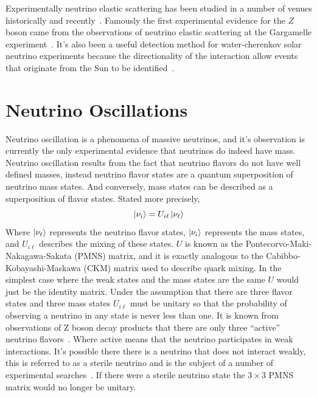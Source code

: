 Experimentally neutrino elastic scattering has been studied in a number
of venues historically and recently~\cite{reines2, es_measurement, nutev}.
Famously the first experimental evidence for the $Z$ boson came from
the observations of neutrino elastic scattering at the
Gargamelle experiment~\cite{gargamelle}.
It's also been a useful detection method for water-cherenkov solar
neutrino experiments because the directionality of the interaction
allow events that originate from the Sun to be identified~\cite{sno_first,
kamiokande, superk_first_solar}.

\section{Neutrino Oscillations}
\label{sec:neut_osc}
Neutrino oscillation is a phenomena of massive neutrinos, and it's observation
is currently the only experimental evidence that neutrinos do indeed have mass.
Neutrino oscillation results from the fact that neutrino flavors do not have
well defined masses, instead neutrino flavor states are a quantum superposition
of neutrino mass states.
And conversely, mass states can be described as a superposition of flavor states.
Stated more precisely,
\begin{equation}
    \ket{\nu_{i}} = U_{i\ell}\ket{\nu_\ell}
\end{equation}
Where $\ket{\nu_\ell}$ represents the neutrino flavor states, $\ket{\nu_i}$
represents the mass states, and $U_{i\ell}$ describes the mixing of these
states.
$U$ is known as the Pontecorvo-Maki-Nakagawa-Sakata (PMNS) matrix,
and it is exactly analogous to the Cabibbo-Kobayashi-Maskawa (CKM) matrix used
to describe quark mixing.
In the simplest case where the weak states and the mass states are the same
$U$ would just be the identity matrix.
Under the assumption that there are three flavor states and three mass states
$U_{i\ell}$ must be unitary so that the probability of observing
a neutrino in any state is never less than one.
It is known from observations of Z boson decay products that
there are only three ``active'' neutrino flavors~\cite{Zdecay}.
Where active means that the neutrino participates in
weak interactions.
It's possible there there is a neutrino that does not interact
weakly, this is referred to as a sterile neutrino and is the
subject of a number of experimental searches~\cite{prospect, lsnd, miniboone, jsns2}.
If there were a sterile neutrino state the $3\times3$ PMNS matrix would
no longer be unitary.

